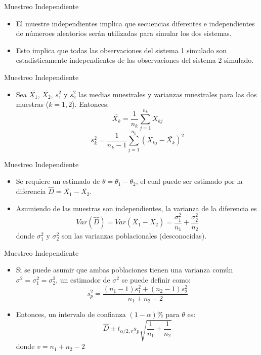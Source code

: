\begin{frame}{Muestreo Independiente}
    \begin{itemize}
        \item El muestre independientes implica que secuencias diferentes e independientes de númeroes aleatorios serán utilizadas para simular los dos sistemas.
        \item Esto implica que todas las observaciones del sistema 1 simulado son estadísticamente independientes de las observaciones del sistema 2 simulado. 
    \end{itemize}
\end{frame}

\begin{frame}{Muestreo Independiente}
    \begin{itemize}
        \item Sea $\bar{X_1}$, $\bar{X_2}$, $s_1^2$ y $s_2^2$ las medias muestrales y varianzas muestrales para las dos muestras ($k=1,2$). Entonces:
        \[\bar{X_k}=\frac{1}{n_k}\sum_{j=1}^{n_k}{X_{kj}}\]
        \[s_k^2=\frac{1}{n_k-1}\sum_{j=1}^{n_k}{(X_{kj}-\bar{X_k})^2}\]
    \end{itemize}
\end{frame}

\begin{frame}{Muestreo Independiente}
    \begin{itemize}
        \item Se requiere un estimado de $\theta=\theta_1-\theta_2$, el cual puede ser estimado por la diferencia $\hat{D}=\bar{X_1}-\bar{X_2}$.
        \item Asumiendo de las muestras son independientes, la varianza de la diferencia es
        \[Var(\hat{D})=Var(\bar{X_1}-\bar{X_2})=\frac{\sigma_1^2}{n_1}+\frac{\sigma_2^2}{n_2}\]
        donde $\sigma_1^2$ y $\sigma_2^2$ son las varianzas poblacionales (desconocidas).
    \end{itemize}
\end{frame}

\begin{frame}{Muestreo Independiente}
    \begin{itemize}
        \item Si se puede asumir que ambas poblaciones tienen una varianza común $\sigma^2=\sigma_1^2=\sigma_2^2$, un estimador de $\sigma^2$ se puede definir como:
        \[s_p^2=\frac{(n_1-1)s_1^2+(n_2-1)s_2^2}{n_1+n_2-2}\]
        \item Entonces, un intervalo de confianza $(1-\alpha)\%$ para $\theta$ es:
        \[\hat{D}\pm t_{\alpha/2,v}s_p\sqrt{\frac{1}{n_1}+\frac{1}{n_2}}\]
        donde $v=n_1+n_2-2$
    \end{itemize}
\end{frame}

